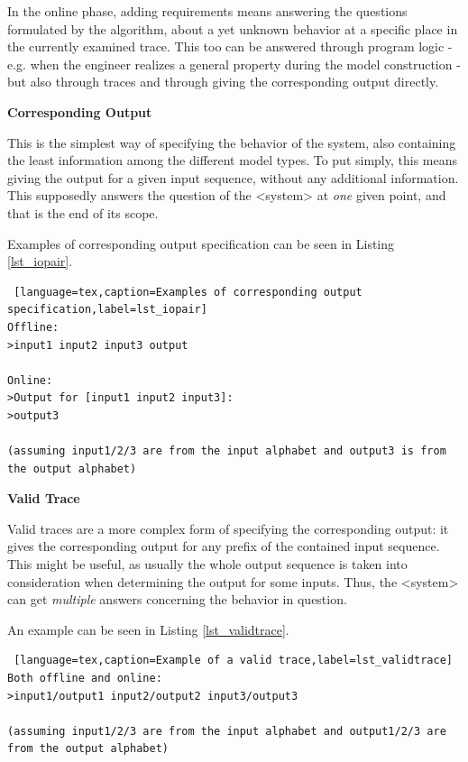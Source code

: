 In the online phase, adding requirements means answering the questions formulated by the algorithm, about a yet unknown behavior at a specific place in the currently examined trace. This too can be answered through program logic - e.g. when the engineer realizes a general property during the model construction - but also through traces and through giving the corresponding output directly.

\textbf{Corresponding Output}

This is the simplest way of specifying the behavior of the system, also containing the least information among the different model types. To put simply, this means giving the output for a given input sequence, without any additional information. This supposedly answers the question of the <system> at \textit{one} given point, and that is the end of its scope.

Examples of corresponding output specification can be seen in Listing \ref{lst_iopair}.

\bigskip
\begin{lstlisting} [language=tex,caption=Examples of corresponding output specification,label=lst_iopair]
Offline: 
>input1 input2 input3 output

Online: 
>Output for [input1 input2 input3]:
>output3

(assuming input1/2/3 are from the input alphabet and output3 is from the output alphabet)
\end{lstlisting}

\textbf{Valid Trace}

Valid traces are a more complex form of specifying the corresponding output: it gives the corresponding output for any prefix of the contained input sequence. This might be useful, as usually the whole output sequence is taken into consideration when determining the output for some inputs. Thus, the <system> can get \textit{multiple} answers concerning the behavior in question.

An example can be seen in Listing \ref{lst_validtrace}.

\bigskip
\begin{lstlisting} [language=tex,caption=Example of a valid trace,label=lst_validtrace]
Both offline and online:
>input1/output1 input2/output2 input3/output3

(assuming input1/2/3 are from the input alphabet and output1/2/3 are from the output alphabet) 
\end{lstlisting}

